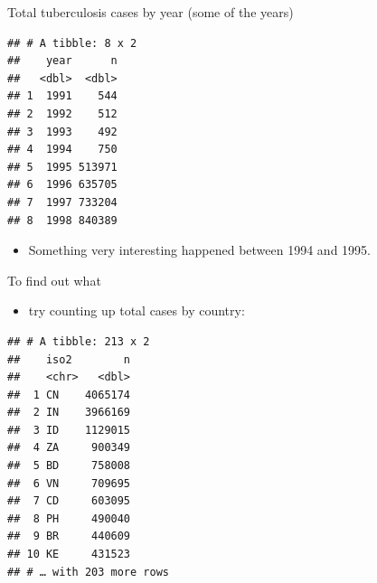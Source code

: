 \documentclass[
  ignorenonframetext,
]{beamer}
\newenvironment{Shaded}{\begin{snugshade}}{\end{snugshade}}
\newcommand{\DataTypeTok}[1]{\textcolor[rgb]{0.13,0.29,0.53}{#1}}
\newcommand{\DecValTok}[1]{\textcolor[rgb]{0.00,0.00,0.81}{#1}}
\newcommand{\KeywordTok}[1]{\textcolor[rgb]{0.13,0.29,0.53}{\textbf{#1}}}
\newcommand{\NormalTok}[1]{#1}
\newcommand{\OperatorTok}[1]{\textcolor[rgb]{0.81,0.36,0.00}{\textbf{#1}}}
\newcommand{\StringTok}[1]{\textcolor[rgb]{0.31,0.60,0.02}{#1}}
\providecommand{\tightlist}{%
  \setlength{\itemsep}{0pt}\setlength{\parskip}{0pt}}
\begin{document}
\begin{frame}[fragile]{Total tuberculosis cases by year (some of the
years)}
\protect\hypertarget{total-tuberculosis-cases-by-year-some-of-the-years}{}

\begin{Shaded}
\end{Shaded}

\begin{verbatim}
## # A tibble: 8 x 2
##    year      n
##   <dbl>  <dbl>
## 1  1991    544
## 2  1992    512
## 3  1993    492
## 4  1994    750
## 5  1995 513971
## 6  1996 635705
## 7  1997 733204
## 8  1998 840389
\end{verbatim}

\begin{itemize}
\tightlist
\item
  Something very interesting happened between 1994 and 1995.
\end{itemize}

\end{frame}

\begin{frame}[fragile]{To find out what}
\protect\hypertarget{to-find-out-what}{}

\begin{itemize}
\tightlist
\item
  try counting up total cases by country:
\end{itemize}

\begin{Shaded}
\end{Shaded}

\begin{verbatim}
## # A tibble: 213 x 2
##    iso2        n
##    <chr>   <dbl>
##  1 CN    4065174
##  2 IN    3966169
##  3 ID    1129015
##  4 ZA     900349
##  5 BD     758008
##  6 VN     709695
##  7 CD     603095
##  8 PH     490040
##  9 BR     440609
## 10 KE     431523
## # … with 203 more rows
\end{verbatim}

\end{frame}
\end{document}
